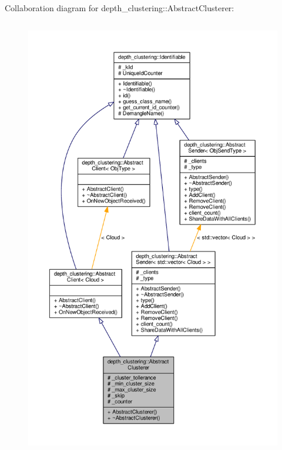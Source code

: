 Collaboration diagram for depth\-\_\-clustering\-:\-:Abstract\-Clusterer\-:
\nopagebreak
\begin{figure}[H]
\begin{center}
\leavevmode
\includegraphics[height=550pt]{classdepth__clustering_1_1AbstractClusterer__coll__graph}
\end{center}
\end{figure}


